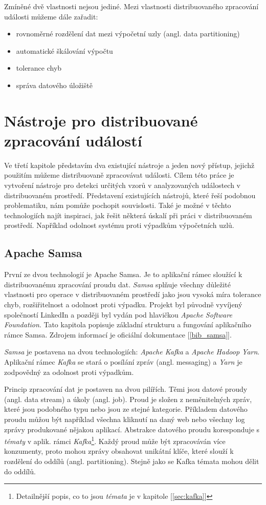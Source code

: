 \documentclass[
  digital, %
  table,   %
  nolof,     %
  nolot,     %
  oneside, %
  nocover,
  monochrome,
  12pt
]{fithesis3}
\begin{document}
Zmíněné dvě vlastnosti nejsou jediné. Mezi vlastnosti distribuovaného zpracování události můžeme dále zařadit:
\begin{itemize}
  \item rovnoměrné rozdělení dat mezi výpočetní uzly (angl. data partitioning)
  \item automatické škálování výpočtu
  \item tolerance chyb
  \item správa datového úložiště
\end{itemize}

\chapter{Nástroje pro distribuované zpracování událostí}
Ve třetí kapitole představím dva existující nástroje a jeden nový přístup, jejichž použitím můžeme distribuovaně zpracovávat události. Cílem této práce je vytvoření nástroje pro detekci určitých vzorů v analyzovaných událostech v distribuovaném prostředí. Představení existujících nástrojů, které řeší podobnou problematiku, nám pomůže pochopit souvislosti. Také je možné v těchto technologiích najít inspiraci, jak řešit některá úskalí při práci v distribuovaném prostředí. Například odolnost systému proti výpadkům výpočetních uzlů.
 
\section{Apache Samsa}
První ze dvou technologií je Apache Samsa. Je to aplikační rámec sloužící k distribuovanému zpracování proudu dat. \textit{Samsa} splňuje všechny důležité vlastnosti pro operace v distribuovaném prostředí jako jsou vysoká míra tolerance chyb, rozšiřitelnost a odolnost proti výpadku. Projekt byl původně vyvíjený společností LinkedIn a později byl vydán pod hlavičkou \textit{Apache Software Foundation}. Tato kapitola popisuje základní strukturu a fungování aplikačního rámce Samsa. Zdrojem informací je oficiální dokumentace [\ref{bib_samsa}].

\textit{Samsa} je postavena na dvou technologiích: \textit{Apache Kafka} a \textit{Apache Hadoop Yarn}. Aplikační rámec \textit{Kafka} se stará o posílání zpráv (angl. messaging) a \textit{Yarn} je zodpovědný za odolnost proti výpadkům.

Princip zpracování dat je postaven na dvou pilířích. Těmi jsou datové proudy (angl. data stream) a úkoly (angl. job). Proud je složen z neměnitelných zpráv, které jsou podobného typu nebo jsou ze stejné kategorie. Příkladem datového proudu můžou být například všechna kliknutí na daný web nebo všechny log zprávy produkované nějakou aplikací. Abstrakce datového proudu koresponduje s \textit{tématy} v aplik. rámci \textit{Kafka}\footnote{Detailnější popis, co to jsou \textit{témata} je v kapitole [\ref{sec:kafka}]}. Každý proud může být zpracováván více konzumenty, proto mohou zprávy obsahovat unikátní klíče, které slouží k rozdělení do oddílů (angl. partitioning). Stejně jako se Kafka témata mohou dělit do oddílů.
\end{document}
